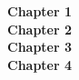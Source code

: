 \documentclass[9pt]{article}
\begin{document}
    \noindent\textbf{Chapter 1}
    \\
    \noindent\textbf{Chapter 2}
    \\
    \noindent\textbf{Chapter 3}
    \\
    \noindent\textbf{Chapter 4}
\end{document}
